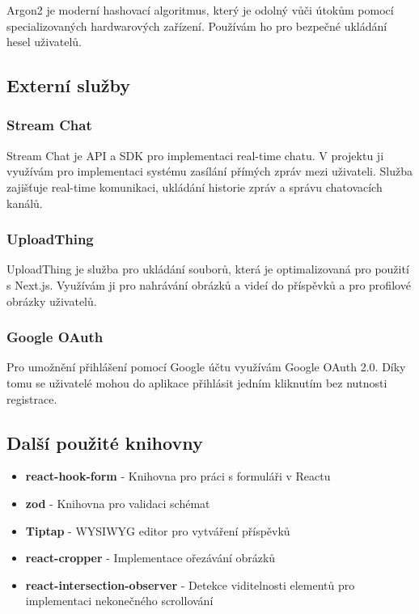\documentclass[12pt]{article}
\begin{document}
Argon2 je moderní hashovací algoritmus, který je odolný vůči útokům pomocí specializovaných hardwarových zařízení. Používám ho pro bezpečné ukládání hesel uživatelů.

\subsection{Externí služby}

\subsubsection{Stream Chat}

Stream Chat je API a SDK pro implementaci real-time chatu. V projektu ji využívám pro implementaci systému zasílání přímých zpráv mezi uživateli. Služba zajišťuje real-time komunikaci, ukládání historie zpráv a správu chatovacích kanálů.

\subsubsection{UploadThing}

UploadThing je služba pro ukládání souborů, která je optimalizovaná pro použití s Next.js. Využívám ji pro nahrávání obrázků a videí do příspěvků a pro profilové obrázky uživatelů.

\subsubsection{Google OAuth}

Pro umožnění přihlášení pomocí Google účtu využívám Google OAuth 2.0. Díky tomu se uživatelé mohou do aplikace přihlásit jedním kliknutím bez nutnosti registrace.

\subsection{Další použité knihovny}

\begin{itemize}
  \item \textbf{react-hook-form} - Knihovna pro práci s formuláři v Reactu
  \item \textbf{zod} - Knihovna pro validaci schémat
  \item \textbf{Tiptap} - WYSIWYG editor pro vytváření příspěvků
  \item \textbf{react-cropper} - Implementace ořezávání obrázků
  \item \textbf{react-intersection-observer} - Detekce viditelnosti elementů pro implementaci nekonečného scrollování
\end{itemize}
\end{document}
